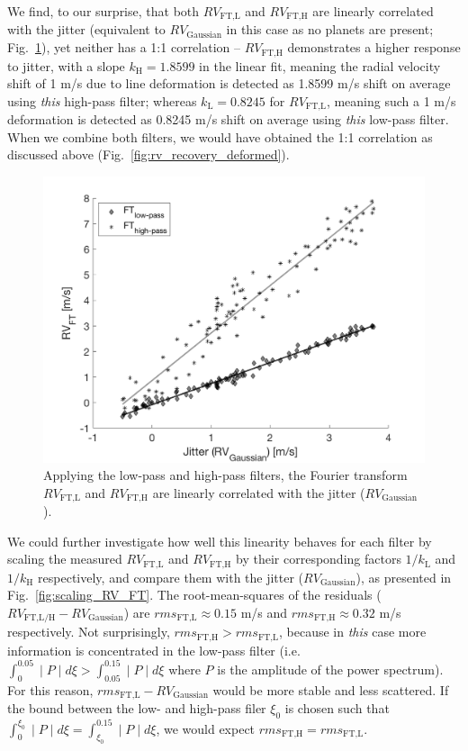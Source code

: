 We find, to our surprise, that both $RV_\text{FT,L}$ and $RV_\text{FT,H}$ are linearly correlated with the jitter (equivalent to $RV_\text{Gaussian}$ in this case as no planets are present; Fig.~\ref{fig:FT_vs_Gaussian}), yet neither has a 1:1 correlation -- $RV_\text{FT,H}$ demonstrates a higher response to jitter, with a slope $k_\text{H} = 1.8599$ in the linear fit, meaning the radial velocity shift of 1 m/s due to line deformation is detected as 1.8599 m/s shift on average using \textit{this} high-pass filter; whereas $k_\text{L} = 0.8245$ for $RV_\text{FT,L}$, meaning such a 1 m/s deformation is detected as 0.8245 m/s shift on average using \textit{this} low-pass filter. When we combine both filters, we would have obtained the 1:1 correlation as discussed above (Fig.~\ref{fig:rv_recovery_deformed}).

\begin{figure}[tbp]
\centering
\includegraphics[width = 0.7 \linewidth]
{./Figures/Methods/5-JITTER_ONLY_1.png}
\caption[Fourier transform in response to line deformation]
{Applying the low-pass and high-pass filters, the Fourier transform $RV_\text{FT,L}$ and $RV_\text{FT,H}$ are linearly correlated with the jitter ($RV_\text{Gaussian}$).}
\label{fig:FT_vs_Gaussian}
\end{figure} 

We could further investigate how well this linearity behaves for each filter by scaling the measured $RV_\text{FT,L}$ and $RV_\text{FT,H}$ by their corresponding factors $1/k_\text{L}$ and $1/k_\text{H}$ respectively, and compare them with the jitter ($RV_\text{Gaussian}$), as presented in Fig.~\ref{fig:scaling_RV_FT}. The root-mean-squares of the residuals ($RV_\text{FT,L/H} - RV_\text{Gaussian}$) are $rms_\text{FT,L} \approx 0.15$ m/s and $rms_\text{FT,H} \approx 0.32$ m/s respectively. Not surprisingly, $rms_\text{FT,H} > rms_\text{FT,L}$, because in \textit{this} case more information is concentrated in the low-pass filter (i.e. $\int_{0}^{0.05} \mid P \mid d\xi > \int_{0.05}^{0.15} \mid P \mid d\xi$ where $P$ is the amplitude of the power spectrum). For this reason, $rms_\text{FT,L}-RV_\text{Gaussian}$ would be more stable and less scattered. If the bound between the low- and high-pass filer $\xi_0$ is chosen such that $\int_{0}^{\xi_0} \mid P \mid d\xi = \int_{\xi_0}^{0.15} \mid P \mid d\xi$, we would expect $rms_\text{FT,H} = rms_\text{FT,L}$. 

